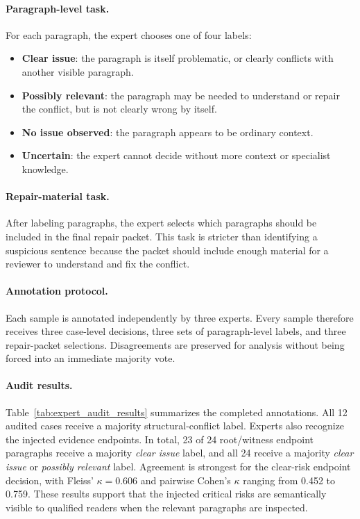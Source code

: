 \documentclass[11pt]{article}
\begin{document}
\paragraph{Paragraph-level task.}
For each paragraph, the expert chooses one of four labels:
\begin{itemize}[leftmargin=*,itemsep=1pt]
    \item \textbf{Clear issue}: the paragraph is itself problematic, or clearly conflicts with another visible paragraph.
    \item \textbf{Possibly relevant}: the paragraph may be needed to understand or repair the conflict, but is not clearly wrong by itself.
    \item \textbf{No issue observed}: the paragraph appears to be ordinary context.
    \item \textbf{Uncertain}: the expert cannot decide without more context or specialist knowledge.
\end{itemize}

\paragraph{Repair-material task.}
After labeling paragraphs, the expert selects which paragraphs should be included in the final repair packet.  This task is stricter than identifying a suspicious sentence because the packet should include enough material for a reviewer to understand and fix the conflict.

\paragraph{Annotation protocol.}
Each sample is annotated independently by three experts.  Every sample therefore receives three case-level decisions, three sets of paragraph-level labels, and three repair-packet selections.  Disagreements are preserved for analysis without being forced into an immediate majority vote.

\paragraph{Audit results.}
Table~\ref{tab:expert_audit_results} summarizes the completed annotations.  All 12 audited cases receive a majority structural-conflict label.  Experts also recognize the injected evidence endpoints.  In total, 23 of 24 root/witness endpoint paragraphs receive a majority \emph{clear issue} label, and all 24 receive a majority \emph{clear issue} or \emph{possibly relevant} label.  Agreement is strongest for the clear-risk endpoint decision, with Fleiss' $\kappa=0.606$ and pairwise Cohen's $\kappa$ ranging from 0.452 to 0.759.  These results support that the injected critical risks are semantically visible to qualified readers when the relevant paragraphs are inspected.
\end{document}
